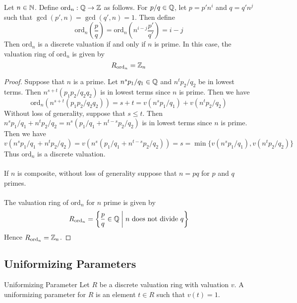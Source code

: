 \documentclass[a4paper]{article}
\begin{document}
\begin{eg}{}{} Let $n\in\mathbb{N}$. Define $\text{ord}_n:\mathbb{Q}\to\mathbb{Z}$ as follows. For $p/q\in\mathbb{Q}$, let $p=p'n^i$ and $q=q'n^j$ such that $\gcd(p',n)=\gcd(q',n)=1$. Then define $$\text{ord}_n\left(\frac{p}{q}\right)=\text{ord}_n\left(n^{i-j}\frac{p'}{q'}\right)=i-j$$ Then $\text{ord}_n$ is a discrete valuation if and only if $n$ is prime. In this case, the valuation ring of $\text{ord}_n$ is given by $$R_{\text{ord}_n}=\mathbb{Z}_n$$ \tcbline
\begin{proof}
Suppose that $n$ is a prime. Let $n^sp_1/q_1\in\mathbb{Q}$ and $n^tp_2/q_2$ be in lowest terms. Then $n^{s+t}(p_1p_2/q_2q_2)$ is in lowest terms since $n$ is prime. Then we have $$\text{ord}_n(n^{s+t}(p_1p_2/q_2q_2))=s+t=v(n^sp_1/q_1)+v(n^tp_2/q_2)$$ Without loss of generality, suppose that $s\leq t$. Then $n^sp_1/q_1+n^tp_2/q_2=n^s(p_1/q_1+n^{t-s}p_2/q_2)$ is in lowest terms since $n$ is prime. Then we have $$v(n^sp_1/q_1+n^tp_2/q_2)=v(n^s(p_1/q_1+n^{t-s}p_2/q_2))=s=\min\{v(n^sp_1/q_1), v(n^tp_2/q_2)\}$$ Thus $\text{ord}_n$ is a discrete valuation. \\~\\

If $n$ is composite, without loss of generality suppose that $n=pq$ for $p$ and $q$ primes. \\~\\

The valuation ring of $\text{ord}_n$ for $n$ prime is given by $$R_{\text{ord}_n}=\left\{\frac{p}{q}\in\mathbb{Q}\;\bigg{|}\;n\text{ does not divide }q\right\}$$ Hence $R_{\text{ord}_n}=\mathbb{Z}_n$. 
\end{proof}
\end{eg}

\subsection{Uniformizing Parameters}
\begin{defn}{Uniformizing Parameter}{} Let $R$ be a discrete valuation ring with valuation $v$. A uniformizing parameter for $R$ is an element $t\in R$ such that $v(t)=1$. 
\end{defn}
\end{document}
